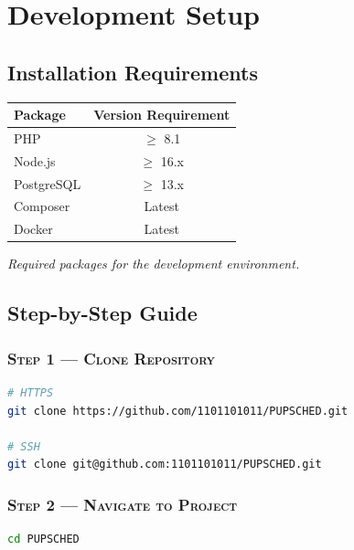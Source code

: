 \documentclass[12pt,letterpaper]{article}
\begin{document}
\section{Development Setup}

\subsection*{Installation Requirements}

\begin{center}
\renewcommand{\arraystretch}{1.3} %
\setlength{\tabcolsep}{12pt}      %
\begin{tabular}{|l|c|}
\hline
\textbf{Package} & \textbf{Version Requirement} \\
\hline
PHP         & $\geq$ 8.1 \\
Node.js     & $\geq$ 16.x \\
PostgreSQL  & $\geq$ 13.x \\
Composer    & Latest \\
Docker    & Latest \\
\hline
\end{tabular}
\end{center}

\captionsetup{type=table}
\caption{\textit{Required packages for the development environment.}}

\vspace{1.5em} %

\subsection*{Step-by-Step Guide}

\subsubsection*{\textsc{Step 1 — Clone Repository}}
\begin{lstlisting}[language=bash]
# HTTPS
git clone https://github.com/1101101011/PUPSCHED.git

# SSH
git clone git@github.com:1101101011/PUPSCHED.git
\end{lstlisting}

\subsubsection*{\textsc{Step 2 — Navigate to Project}}
\begin{lstlisting}[language=bash]
cd PUPSCHED
\end{lstlisting}
\end{document}
